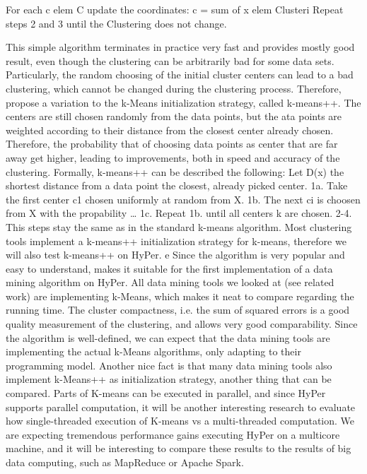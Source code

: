 For each c elem C update the coordinates: c = sum of x elem Clusteri 
Repeat steps 2 and 3 until the Clustering does not change.

This simple algorithm terminates in practice very fast and provides mostly good result, even though the clustering can be arbitrarily bad for some data sets. Particularly, the random choosing of the initial cluster centers can lead to a bad clustering, which cannot be changed during the clustering process. Therefore,  propose a variation to the k-Means initialization strategy, called k-means++. The centers are still chosen randomly from the data points, but the ata points are weighted according to their distance from the closest center already chosen. Therefore, the probability that of choosing data points as center that are far away get higher, leading to improvements, both in speed and accuracy of the clustering.
Formally, k-means++ can be described the following:
Let D(x) the shortest distance from a data point the closest, already picked center. 
1a. Take the first center c1 chosen uniformly at random from X.
1b. The next ci is choosen from X with the propability …
1c. Repeat 1b. until all centers k are chosen.
2-4. This steps stay the same as in the standard k-means algorithm.
Most clustering tools implement a k-means++ initialization strategy for k-means, therefore we will also test k-means++ on HyPer.
e
Since the algorithm is very popular and easy to understand, makes it suitable for the first implementation of a data mining algorithm on HyPer. All data mining tools we looked at (see related work) are implementing k-Means, which makes it neat to compare regarding the running time. The cluster compactness, i.e. the sum of squared errors is a good quality measurement of the clustering, and allows very good comparability. Since the algorithm is well-defined, we can expect that the data mining tools are implementing the actual k-Means algorithms, only adapting to their programming model. Another nice fact is that many data mining tools also implement k-Means++ as initialization strategy, another thing that can be compared.
Parts of K-means can be executed in parallel, and since HyPer supports parallel computation, it will be another interesting research to evaluate how single-threaded execution of K-means vs a multi-threaded computation. We are expecting tremendous performance gains executing HyPer on a multicore machine, and it will be interesting to compare these results to the results of big data computing, such as MapReduce or Apache Spark.


